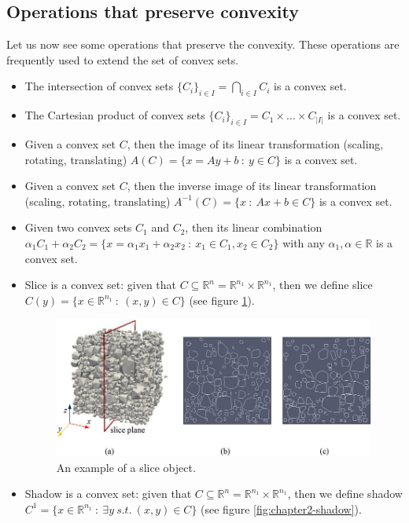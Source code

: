 \subsection{Operations that preserve convexity}
\par Let us now see some operations that preserve the convexity. These operations are frequently used to extend the set of convex sets.
\begin{itemize}
    \item The intersection of convex sets $\{C_i\}_{i \in I} = \bigcap_{i \in I} C_i$ is a convex set.
    \item The Cartesian product of convex sets $\{C_i\}_{i \in I} = C_1 \times ... \times C_{|I|}$ is a convex set.
    \item Given a convex set $C$, then the image of its linear transformation (scaling, rotating, translating) $A(C) = \{x = Ay + b\ :\ y \in C\}$ is a convex set.
    \item Given a convex set $C$, then the inverse image of its linear transformation (scaling, rotating, translating) $A^{-1}(C) = \{x\ :\ Ax + b \in C\}$ is a convex set.
    \item Given two convex sets $C_1$ and $C_2$, then its linear combination $\alpha_1 C_1 + \alpha_2 C_2 = \{x = \alpha_1 x_1 + \alpha_2 x_2\ :\ x_1 \in C_1, x_2 \in C_2\}$ with any $\alpha_1, \alpha \in \mathbb{R}$ is a convex set.
    \item Slice is a convex set: given that $C \subseteq \mathbb{R}^n = \mathbb{R}^{n_1} \times \mathbb{R}^{n_1}$, then we define slice $C(y) = \{x \in \mathbb{R}^{n_1}\ :\ (x,y) \in C\}$ (see figure \ref{fig:chapter2-slice}).
    \begin{figure}
        \centering
        \includegraphics[scale=0.3]{figures/2/chapter2-slice.png}
        \caption{An example of a slice object.}
        \label{fig:chapter2-slice}
    \end{figure}
    \item Shadow is a convex set: given that $C \subseteq \mathbb{R}^n = \mathbb{R}^{n_1} \times \mathbb{R}^{n_1}$, then we define shadow $C^1 = \{x \in \mathbb{R}^{n_1}\ :\ \exists y\ s.t.\ (x,y) \in C\}$ (see figure \ref{fig:chapter2-shadow}).

\end{itemize}
